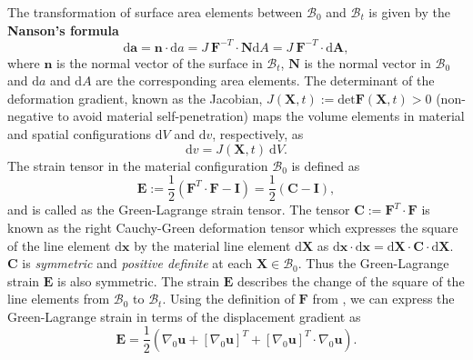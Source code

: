 The transformation of surface area elements between $\mathcal{B}_0$ and $\mathcal{B}_t$ is given by the \textbf{Nanson's formula}
\begin{equation}
\bm{\mathrm{d}}\mathbf{a} = \mathbf{n} \cdot \mathrm{d}a = J \ \mathbf{F}^{-T} \cdot \mathbf{N} \mathrm{d}A = J \ \mathbf{F}^{-T} \cdot \bm{\mathrm{d}}\mathbf{A},
\end{equation}
where $\mathbf{n}$ is the normal vector of the surface in $\mathcal{B}_t$, $\mathbf{N}$ is the normal vector in $\mathcal{B}_0$ and $\mathrm{d}a$ and $\mathrm{d}A$ are the corresponding area elements. The determinant of the deformation gradient, known as the Jacobian, $J(\mathbf{X}, t) := \text{det} \mathbf{F}(\mathbf{X}, t) > 0$ (non-negative to avoid material self-penetration) maps the volume elements in material and spatial configurations $\mathrm{d}V$ and $\mathrm{d}v$, respectively, as 
\begin{equation}
\mathrm{d}v = J(\mathbf{X}, t) \ \mathrm{d}V.
\end{equation} 
The strain tensor in the material configuration $\mathcal{B}_0$ is defined as
\begin{equation}
\mathbf{E} := \frac{1}{2} (\mathbf{F}^T \cdot \mathbf{F} - \mathbf{I}) = \frac{1}{2} (\mathbf{C} - \mathbf{I}),
\end{equation}
and is called as the Green-Lagrange strain tensor. The tensor $\mathbf{C}:= \mathbf{F}^T \cdot \mathbf{F}$ is known as the right Cauchy-Green deformation tensor which expresses the square of the line element $\bm{\mathrm{d}}\mathbf{x}$ by the material line element $\bm{\mathrm{d}}\mathbf{X}$ as $\bm{\mathrm{d}}\mathbf{x} \cdot \bm{\mathrm{d}}\mathbf{x} = \bm{\mathrm{d}}\mathbf{X} \cdot \mathbf{C} \cdot \bm{\mathrm{d}}\mathbf{X}$. $\mathbf{C}$ is \textit{symmetric} and \textit{positive definite} at each $\mathbf{X} \in \mathcal{B}_0$. Thus the Green-Lagrange strain $\mathbf{E}$ is also symmetric. The strain $\mathbf{E}$ describes the change of the square of the line elements from $\mathcal{B}_0$ to $\mathcal{B}_t$. Using the definition of $\mathbf{F}$ from , we can express the Green-Lagrange strain in terms of the displacement gradient as 
\begin{equation}
\mathbf{E} = \frac{1}{2} ( \nabla_0 \mathbf{u} + [\nabla_0 \mathbf{u}]^T + [\nabla_0 \mathbf{u}]^T \cdot \nabla_0 \mathbf{u} ).
\end{equation}

